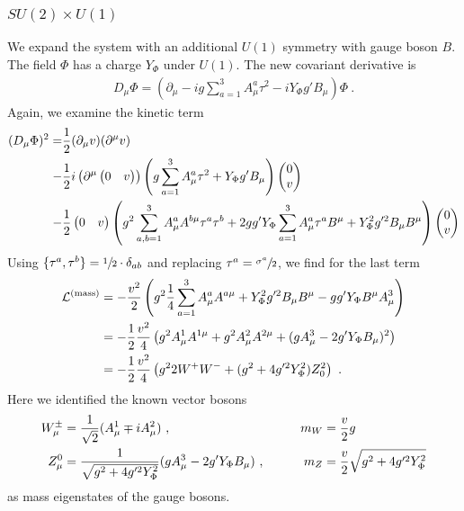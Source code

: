 \subsubsection{$SU(2)\times U(1)$}
We expand the system with an additional $U(1)$ symmetry with gauge boson $B$. The field $\Phi$ has a charge $Y_\Phi$ under $U(1)$. The new covariant derivative is
\begin{align}
	D_\mu\Phi = \left(\partial_\mu - ig\sum_{a=1}^3A_\mu^a\tau^2 - iY_\Phi g'B_\mu\right)\Phi \ .
\end{align}
Again, we examine the kinetic term
\begin{align}
	(D_\mu\Phi)^2 = &\frac{1}{2}(\partial_\mu v)(\partial^\mu v)\notag \\
	- &\frac{1}{2}i\left(\partial^\mu\begin{pmatrix} 0 & v \end{pmatrix}\right) \left(g\sum_{a=1}^3A_\mu^a\tau^2 + Y_\Phi g'B_\mu\right)\begin{pmatrix} 0 \\ v \end{pmatrix}\notag \\
	- &\frac{1}{2}\begin{pmatrix} 0 & v \end{pmatrix}
	\left(g^2\sum_{a,b=1}^3A_\mu^aA^{b\mu}\tau^a\tau^b + 2gg'Y_\Phi\sum_{a=1}^3A_\mu^a\tau^aB^\mu + Y_\Phi^2g'^2B_\mu B^\mu\right)
	\begin{pmatrix} 0 \\ v \end{pmatrix}
\end{align}
Using $\{\tau^a,\tau^b\}=\sfrac{1}{2}\cdot\delta_{ab}$ and replacing $\tau^a=\sfrac{\sigma^a}{2}$, we find for the last term
\begin{align}
	\mathcal{L}^{(\text{mass})} &= - \frac{v^2}{2}\left(g^2\frac{1}{4}\sum_{a=1}^3A_\mu^aA^{a\mu} + Y_\Phi^2g'^2B_\mu B^\mu - gg'Y_\Phi B^\mu A_\mu^3\right)\notag \\
	&= - \frac{1}{2}\frac{v^2}{4}\left(g^2A_\mu^1A^{1\mu} + g^2A_\mu^2A^{2\mu} + (gA_\mu^3 - 2g'Y_\Phi B_\mu)^2\right)\notag \\
	&= - \frac{1}{2}\frac{v^2}{4}\left(g^22W^+W^- + (g^2+4g'^2Y_\Phi^2)Z_0^2\right) \ .
\end{align}
Here we identified the known vector bosons
\begin{align}
	W_\mu^\pm &= \frac{1}{\sqrt{2}}(A_\mu^1\mp iA_\mu^2) \ , &&\quad &m_W &= \frac{v}{2}g \notag \\
	Z_\mu^0 &= \frac{1}{\sqrt{g^2+4g'^2Y_\Phi^2}}(gA_\mu^3 - 2g'Y_\Phi B_\mu) \ , &&\quad &m_Z &= \frac{v}{2}\sqrt{g^2+4g'^2Y_\Phi^2}
\end{align}
as mass eigenstates of the gauge bosons.


